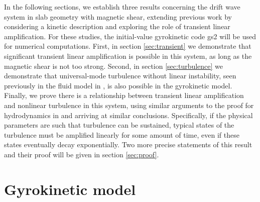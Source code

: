 \documentclass[12pt,superscriptaddress]{revtex4}
\begin{document}
In the following sections, we establish three results concerning the drift wave system in slab geometry
with magnetic shear,
extending previous work by considering a kinetic description and exploring the role of transient linear amplification.
For these studies, the initial-value gyrokinetic code gs2 \cite{gs2} will be used
for numerical computations.
First, in section \ref{sec:transient} we demonstrate that
significant transient linear amplification is possible in this system,
as long as the magnetic shear is not too strong.
Second, in section \ref{sec:turbulence} we demonstrate that universal-mode turbulence without linear
instability, seen previously in the fluid model in \cite{Drake},
is also possible in the gyrokinetic model.
Finally, we prove there is a relationship between
transient linear amplification and nonlinear turbulence in this system,
using similar arguments to the proof for hydrodynamics in \cite{DelSoleNecessity}
and arriving at similar conclusions.
Specifically, if the physical parameters are such that turbulence can be sustained,
typical states of the turbulence must be amplified linearly for some amount of time, even if these states
eventually decay exponentially.
Two more precise statements of this result and their proof will be given in section \ref{sec:proof}.

\section{Gyrokinetic model}
\label{sec:model}
\end{document}
